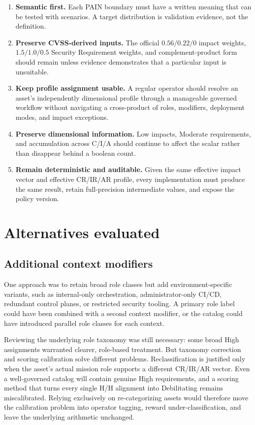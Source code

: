 \documentclass[11pt]{article}
\begin{document}
\begin{enumerate}[leftmargin=1.7em]
\item \textbf{Semantic first.} Each PAIN boundary must have a written meaning that
  can be tested with scenarios. A target distribution is validation evidence, not
  the definition.
\item \textbf{Preserve CVSS-derived inputs.} The official $0.56/0.22/0$ impact
  weights, $1.5/1.0/0.5$ Security Requirement weights, and complement-product form
  should remain unless evidence demonstrates that a particular input is unsuitable.
\item \textbf{Keep profile assignment usable.} A regular operator should resolve an
  asset's independently dimensional profile through a manageable governed workflow
  without navigating a cross-product of roles, modifiers, deployment modes, and
  impact exceptions.
\item \textbf{Preserve dimensional information.} Low impacts, Moderate requirements,
  and accumulation across C/I/A should continue to affect the scalar rather than
  disappear behind a boolean count.
\item \textbf{Remain deterministic and auditable.} Given the same effective impact
  vector and effective CR/IR/AR profile, every implementation must produce the same
  result, retain full-precision intermediate values, and expose the policy version.
\end{enumerate}

\section{Alternatives evaluated}
\label{sec:alternatives}

\subsection{Additional context modifiers}

One approach was to retain broad role classes but add environment-specific variants,
such as internal-only orchestration, administrator-only CI/CD, redundant control
planes, or restricted security tooling. A primary role label could have been
combined with a second context modifier, or the catalog could have introduced
parallel role classes for each context.

Reviewing the underlying role taxonomy was still necessary: some broad High
assignments warranted clearer, role-based treatment. But taxonomy correction and
scoring calibration solve different problems. Reclassification is justified only
when the asset's actual mission role supports a different CR/IR/AR vector. Even a
well-governed catalog will contain genuine High requirements, and a scoring method
that turns every single H/H alignment into Debilitating remains miscalibrated.
Relying exclusively on re-categorizing assets would therefore move the calibration
problem into operator tagging, reward under-classification, and leave the underlying
arithmetic unchanged.
\end{document}
